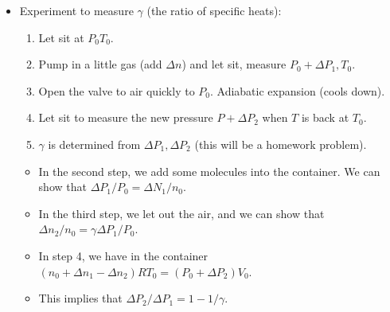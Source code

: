 \documentclass[../notes.tex]{subfiles}
\begin{document}
\begin{itemize}
    \item Experiment to measure $\gamma$ (the ratio of specific heats):
    \begin{enumerate}
        \item Let sit at $P_0T_0$.
        \item Pump in a little gas (add $\Delta n$) and let sit, measure $P_0+\Delta P_1,T_0$.
        \item Open the valve to air quickly to $P_0$. Adiabatic expansion (cools down).
        \item Let sit to measure the new pressure $P+\Delta P_2$ when $T$ is back at $T_0$.
        \item $\gamma$ is determined from $\Delta P_1,\Delta P_2$ (this will be a homework problem).
    \end{enumerate}
    \begin{itemize}
        \item In the second step, we add some molecules into the container. We can show that $\Delta P_1/P_0=\Delta N_1/n_0$.
        \item In the third step, we let out the air, and we can show that $\Delta n_2/n_0=\gamma\Delta P_1/P_0$.
        \item In step 4, we have in the container $(n_0+\Delta n_1-\Delta n_2)RT_0=(P_0+\Delta P_2)V_0$.
        \item This implies that $\Delta P_2/\Delta P_1=1-1/\gamma$.
    \end{itemize}
\end{itemize}
\end{document}
